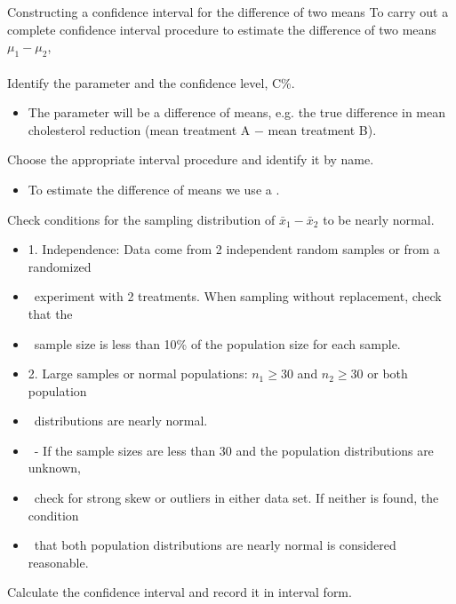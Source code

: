 \begin{onebox}{Constructing a confidence interval for the difference of two means}
To carry out a complete confidence interval procedure to estimate the difference of two means $\mu_1 - \mu_2$,
\\
\\
 Identify the parameter and the confidence level, C\%.
\begin{itemize}\vspace{-1mm}
\setlength{\itemsep}{0mm}
\item[] The parameter will be a difference of means, e.g. the true difference in mean cholesterol reduction (mean treatment A $-$ mean treatment B).  
\end{itemize}
  Choose the appropriate interval procedure and identify it by name.  \vspace{-1mm}
\begin{itemize}
\item[] To estimate the difference of means we use a .
\end{itemize}
  Check conditions for the sampling distribution of $\bar{x}_1-\bar{x}_2$ to be nearly normal.\vspace{-1mm}
\begin{itemize}
\setlength{\itemsep}{0mm}
\item[] 1. Independence:  Data come from 2 independent random samples or from a randomized 
\item[] \ \quad experiment with 2 treatments.  When sampling without replacement, check that the  
\item[] \ \quad sample size is less than 10\% of the population size for each sample.
\item[] 2. Large samples or normal populations:  $n_1\ge 30$ and $n_2\ge 30$ or both population 
\item[] \ \quad distributions are nearly normal.
\item[] \quad \ - If the sample sizes are less than 30 and the population distributions are unknown, 
\item[] \quad \ check for strong skew or outliers in either data set.  If neither is found, the condition 
\item[] \quad \ that both population distributions are nearly normal is considered reasonable.  
\end{itemize}
   Calculate the confidence interval and record it in interval form.

\end{onebox}
